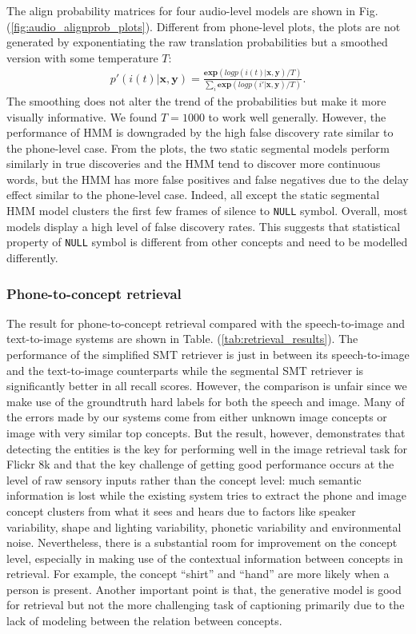\documentclass[journal]{IEEEtran}
\begin{document}
The align probability matrices for four audio-level models are shown in Fig. (\ref{fig:audio_alignprob_plots}). Different from phone-level plots, the plots are not generated by exponentiating the raw translation probabilities but a smoothed version with some temperature $T$:
\begin{align*}
    p'(i(t)|\mathbf x, \mathbf y) = \frac{\mathbf{exp}(logp(i(t)|\mathbf x, \mathbf y)/T)}{\sum_i \mathbf{exp}(logp(i'|\mathbf x, \mathbf y)/T)}.
\end{align*}
The smoothing does not alter the trend of the probabilities but make it more visually informative. We found $T=1000$ to work well generally. However, the performance of HMM is downgraded by the high false discovery rate similar to the phone-level case. From the plots, the two static segmental models perform similarly in true discoveries and the HMM tend to discover more continuous words, but the HMM has more false positives and false negatives due to the delay effect similar to the phone-level case. Indeed, all except the static segmental HMM model clusters the first few frames of silence to \texttt{NULL} symbol. Overall, most models display a high level of false discovery rates. This suggests that statistical property of \texttt{NULL} symbol is different from other concepts and need to be modelled differently.  



\subsubsection{Phone-to-concept retrieval}
The result for phone-to-concept retrieval compared with the speech-to-image and text-to-image systems are shown in Table. (\ref{tab:retrieval_results}). The performance of the simplified SMT retriever is just in between its speech-to-image and the text-to-image counterparts while the segmental SMT retriever is significantly better in all recall scores. However, the comparison is unfair since we make use of the groundtruth hard labels for both the speech and image. Many of the errors made by our systems come from either unknown image concepts or image with very similar top concepts. But the result, however, demonstrates that detecting the entities is the key for performing well in the image retrieval task for Flickr 8k and that the key challenge of getting good performance occurs at the level of raw sensory inputs rather than the concept level: much semantic information is lost while the existing system tries to extract the phone  and image concept clusters from what it sees and hears due to factors like speaker variability, shape and lighting variability, phonetic variability and environmental noise. Nevertheless, there is a substantial room for improvement on the concept level, especially in making use of the contextual information between concepts in retrieval. For example, the concept ``shirt'' and ``hand'' are more likely when a person is present. Another important point is that, the generative model is good for retrieval but not the more challenging task of captioning primarily due to the lack of modeling between the relation between concepts.  
\end{document}
